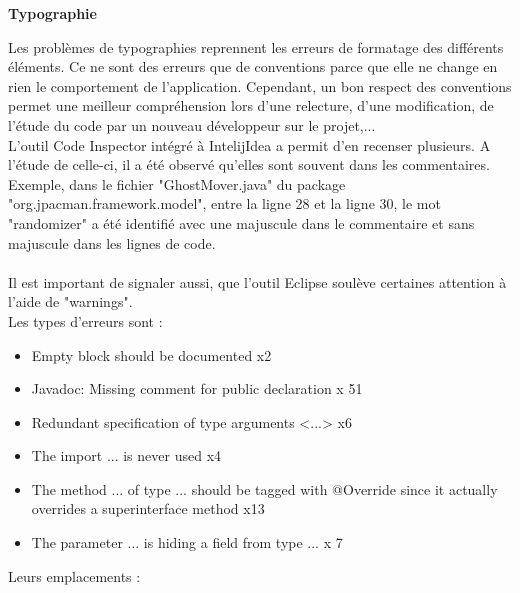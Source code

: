 \documentclass[12pt,a4paper,final]{article}
\newcommand{\smalltitle}[1]{\bigskip\large\textbf{#1}\par\normalsize\medskip}
\begin{document}
\smalltitle{Typographie}
Les problèmes de typographies reprennent les erreurs de formatage des différents éléments. Ce ne sont des erreurs que de conventions parce que elle ne change en rien le comportement de l'application. Cependant, un bon respect des conventions permet une meilleur compréhension lors d'une relecture, d'une modification, de l'étude du code par un nouveau développeur sur le projet,...\\
L'outil Code Inspector intégré à IntelijIdea a permit d'en recenser plusieurs. A l'étude de celle-ci, il a été observé qu'elles sont souvent dans les commentaires. Exemple, dans le fichier "GhostMover.java" du package "org.jpacman.framework.model", entre la ligne 28 et la ligne 30, le mot "randomizer" a été identifié avec une majuscule dans le commentaire et sans majuscule dans les lignes de code.\\ \\
Il est important de signaler aussi, que l'outil Eclipse soulève certaines attention à l'aide de "warnings".\\
Les types d'erreurs sont : 
\begin{itemize}
\item Empty block should be documented x2
\item Javadoc: Missing comment for public declaration x 51
\item Redundant specification of type arguments <...> x6
\item The import ... is never used x4
\item The method ... of type ... should be tagged with @Override since it actually overrides a superinterface method x13
\item The parameter ... is hiding a field from type ... x 7
\end {itemize}
Leurs emplacements : \\
\end{document}
